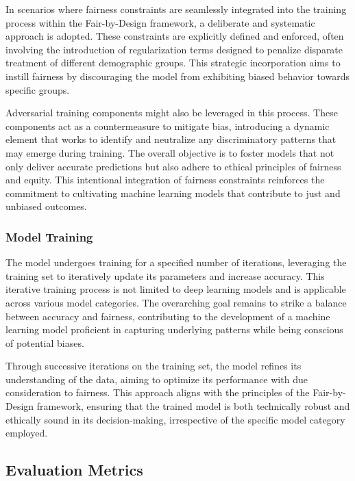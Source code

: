 \documentclass[12pt,a4paper,openright,twoside]{book}
\begin{document}
In scenarios where fairness constraints are seamlessly integrated into the training process within the Fair-by-Design framework, a deliberate and systematic approach is adopted. These constraints are explicitly defined and enforced, often involving the introduction of regularization terms designed to penalize disparate treatment of different demographic groups. This strategic incorporation aims to instill fairness by discouraging the model from exhibiting biased behavior towards specific groups.

Adversarial training components might also be leveraged in this process. These components act as a countermeasure to mitigate bias, introducing a dynamic element that works to identify and neutralize any discriminatory patterns that may emerge during training. The overall objective is to foster models that not only deliver accurate predictions but also adhere to ethical principles of fairness and equity. This intentional integration of fairness constraints reinforces the commitment to cultivating machine learning models that contribute to just and unbiased outcomes.

\subsubsection{Model Training}

The model undergoes training for a specified number of iterations, leveraging the training set to iteratively update its parameters and increase accuracy. This iterative training process is not limited to deep learning models and is applicable across various model categories. The overarching goal remains to strike a balance between accuracy and fairness, contributing to the development of a machine learning model proficient in capturing underlying patterns while being conscious of potential biases.

Through successive iterations on the training set, the model refines its understanding of the data, aiming to optimize its performance with due consideration to fairness. This approach aligns with the principles of the Fair-by-Design framework, ensuring that the trained model is both technically robust and ethically sound in its decision-making, irrespective of the specific model category employed.

\subsection{Evaluation Metrics}
\end{document}
